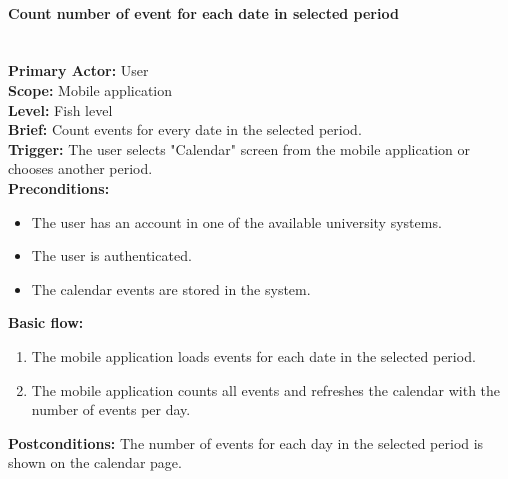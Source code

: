 \paragraph{\large{Count number of event for each date in selected period}}\mbox{}\\[2pt]
\textbf{Primary Actor:} User\\
\textbf{Scope:} Mobile application\\
\textbf{Level:} Fish level\\
\textbf{Brief:} Count events for every date in the selected period.\\
\textbf{Trigger:} The user selects "Calendar" screen from the mobile application or chooses another period.\\
\textbf{Preconditions:}
\begin{itemize}
    \item The user has an account in one of the available university systems.
    \item The user is authenticated.
    \item The calendar events are stored in the system.
\end{itemize}
\textbf{Basic flow:}
\begin{enumerate}
    \item The mobile application loads events for each date in the selected period.
    \item The mobile application counts all events and refreshes the calendar with the number of events per day.
\end{enumerate}
\textbf{Postconditions:}
The number of events for each day in the selected period is shown on the calendar page.


